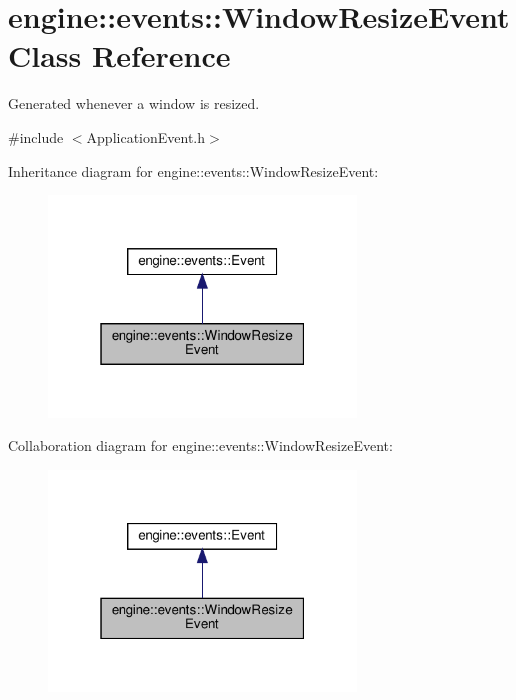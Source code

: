 \hypertarget{classengine_1_1events_1_1WindowResizeEvent}{}\section{engine\+:\+:events\+:\+:Window\+Resize\+Event Class Reference}
\label{classengine_1_1events_1_1WindowResizeEvent}


Generated whenever a window is resized.  




{\ttfamily \#include $<$Application\+Event.\+h$>$}



Inheritance diagram for engine\+:\+:events\+:\+:Window\+Resize\+Event\+:\nopagebreak
\begin{figure}[H]
\begin{center}
\leavevmode
\includegraphics[width=232pt]{classengine_1_1events_1_1WindowResizeEvent__inherit__graph}
\end{center}
\end{figure}


Collaboration diagram for engine\+:\+:events\+:\+:Window\+Resize\+Event\+:\nopagebreak
\begin{figure}[H]
\begin{center}
\leavevmode
\includegraphics[width=232pt]{classengine_1_1events_1_1WindowResizeEvent__coll__graph}
\end{center}
\end{figure}

